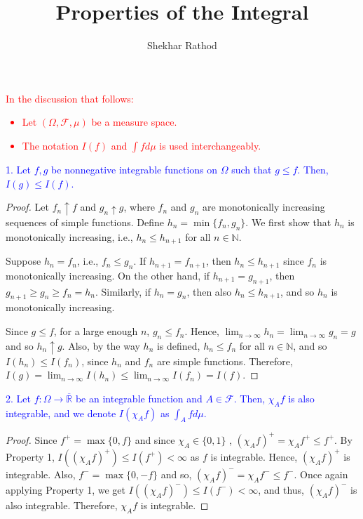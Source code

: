\documentclass[12pt]{extarticle}
\title{Properties of the Integral}
\author{Shekhar Rathod}
\date{}
\newcommand{\F}{\mathscr{F}}
\newcommand{\R}{\overline{\mathbb{R}}}
\begin{document}
\maketitle

\textcolor{red}{
In the discussion that follows:
\begin{itemize}
    \item Let $(\Omega, \F, \mu)$ be a measure space.
    \item The notation $I(f)$ and $\int f d\mu$ is used interchangeably. 
\end{itemize}}

\textcolor{blue}{1. Let $f, g$ be nonnegative integrable functions on $\Omega$ such that $g \leq f$. Then, $I(g) \leq I(f)$.
}

\begin{proof}
Let $f_n \uparrow f$ and $g_n \uparrow g$, where $f_n$ and $g_n$ are monotonically increasing sequences of simple functions. Define $h_n = \min\{f_n, g_n\}$. We first show that $h_n$ is monotonically increasing, i.e., $h_n \leq h_{n + 1}$ for all $n \in \mathbb{N}$. 

Suppose $h_n = f_n$, i.e., $f_n \leq g_n$. If $h_{n + 1} = f_{n + 1}$, then $h_n \leq h_{n + 1}$ since $f_n$ is monotonically increasing. On the other hand, if $h_{n + 1} = g_{n + 1}$, then $g_{n + 1} \geq g_n \geq f_n = h_n$. Similarly, if $h_n = g_n$, then also $h_{n} \leq h_{n + 1}$, and so $h_n$ is monotonically increasing.

Since $g \leq f$, for a large enough $n$, $g_n \leq f_n$. Hence, $\lim_{n \to \infty} h_n = \lim_{n \to \infty} g_n = g$ and so $h_n \uparrow g$. Also, by the way $h_n$ is defined, $h_n \leq f_n$ for all $n \in \mathbb{N}$, and so $I(h_n) \leq I(f_n)$, since $h_n$ and $f_n$ are simple functions. Therefore, $I(g) = \lim_{n \to \infty} I(h_n) \leq \lim_{n \to \infty} I(f_n) = I(f)$.
\end{proof}

\textcolor{blue}{2. Let $f: \Omega \to \R$ be an integrable function and $A \in \F$. Then, $\chi_Af$ is also integrable, and we denote $I(\chi_Af)$ as $\int_A f d\mu.$}

\begin{proof}
    Since $f^+ = \max\{0, f\}$ and since $\chi_A \in \{0, 1\}$ , $(\chi_Af)^+ = \chi_A f^+ \leq f^+$. By Property 1, $I((\chi_Af)^+) \leq I(f^+)< \infty$ as $f$ is integrable. Hence, $(\chi_Af)^+$ is integrable. Also, $f^- = \max\{0, - f\}$ and so, $(\chi_Af)^- = \chi_A f^- \leq f^-$. Once again applying Property 1, we get $I((\chi_Af)^-) \leq I(f^-) < \infty$, and thus, $(\chi_Af)^-$ is also integrable. Therefore, $\chi_Af$ is integrable.
\end{proof}
\end{document}
